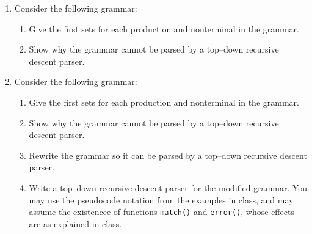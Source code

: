 \documentclass[11pt]{article}
\begin{document}
\begin{enumerate}
\begin{enumerate}
            \item {}

          \end{enumerate}

          \vspace{-2.5mm}

    \item Consider the following grammar:

          \vspace{-2mm}

          \begin{enumerate}

            \addtolength{\itemsep}{4mm}

            \item Give the first sets for each production and nonterminal in
                  the grammar.

            \item Show why the grammar cannot be parsed by a top--down
                  recursive descent parser.

          \end{enumerate}

    \item Consider the following grammar:

          \vspace{-2mm}

          \begin{enumerate}

            \addtolength{\itemsep}{4mm}

            \item Give the first sets for each production and nonterminal in
                  the grammar.

            \item Show why the grammar cannot be parsed by a top--down
                  recursive descent parser.

            \item Rewrite the grammar so it can be parsed by a top--down
                  recursive descent parser.

            \item Write a top--down recursive descent parser for the
                  modified grammar.  You may use the pseudocode notation
                  from the examples in class, and may assume the existencee
                  of functions \texttt{match()} and \texttt{error()}, whose
                  effects are as explained in class.

          \end{enumerate}

  \end{enumerate}
\end{document}
